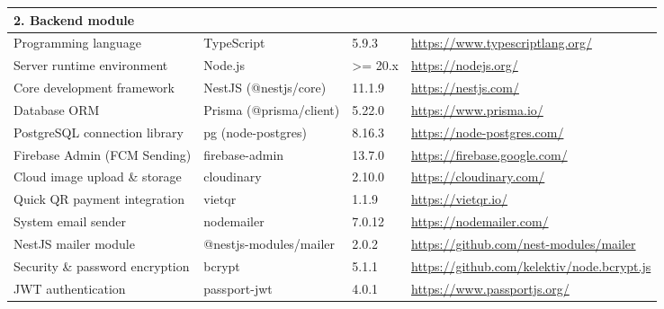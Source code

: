\documentclass[../Main.tex]{subfiles}
\begin{document}
\begin{longtable}{ p{} p{} p{} p{} }
    \multicolumn{4}{l}{\textbf{2. Backend module}}                                                                           \\ \hline
    Programming language            & TypeScript                            & 5.9.3            & \url{https://www.typescriptlang.org/}                           \\
    Server runtime environment      & Node.js                               & >= 20.x          & \url{https://nodejs.org/}                                       \\
    Core development framework      & NestJS (@nestjs/core)                 & 11.1.9           & \url{https://nestjs.com/}                                       \\
    Database ORM                    & Prisma (@prisma/client)               & 5.22.0           & \url{https://www.prisma.io/}                                    \\
    PostgreSQL connection library   & pg (node-postgres)                    & 8.16.3           & \url{https://node-postgres.com/}                                \\
    Firebase Admin (FCM Sending)    & firebase-admin                        & 13.7.0           & \url{https://firebase.google.com/}                              \\
    Cloud image upload \& storage   & cloudinary                            & 2.10.0           & \url{https://cloudinary.com/}                                   \\
    Quick QR payment integration    & vietqr                                & 1.1.9            & \url{https://vietqr.io/}                                        \\
    System email sender             & nodemailer                            & 7.0.12           & \url{https://nodemailer.com/}                                   \\
    NestJS mailer module            & @nestjs-modules/mailer                & 2.0.2            & \url{https://github.com/nest-modules/mailer}                    \\
    Security \& password encryption & bcrypt                                & 5.1.1            & \url{https://github.com/kelektiv/node.bcrypt.js}                \\
    JWT authentication              & passport-jwt                          & 4.0.1            & \url{https://www.passportjs.org/}                               \\

\end{longtable}
\end{document}
